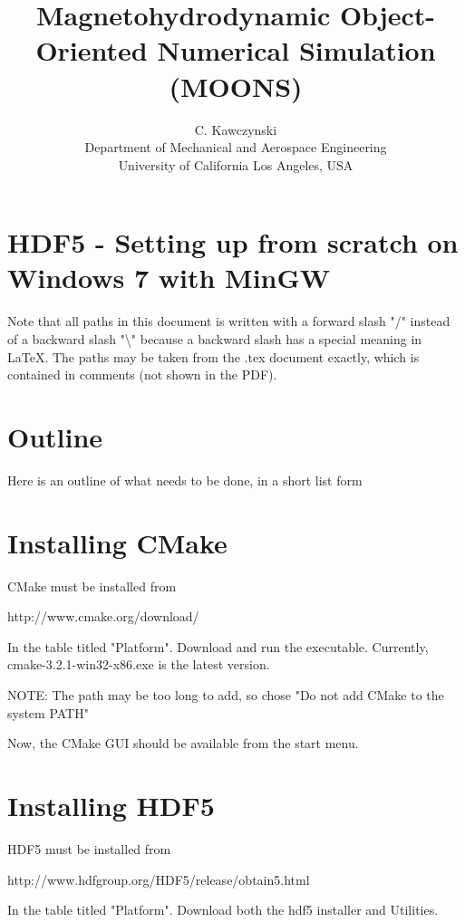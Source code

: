 \documentclass[11pt]{article}
\begin{document}
\doublespacing
\title{Magnetohydrodynamic Object-Oriented Numerical Simulation (MOONS)}
\author{C. Kawczynski \\
Department of Mechanical and Aerospace Engineering \\
University of California Los Angeles, USA\\
}
\maketitle

\section{HDF5 - Setting up from scratch on Windows 7 with MinGW}
Note that all paths in this document is written with a forward slash "/" instead of a backward slash "\textbackslash" because a backward slash has a special meaning in LaTeX. The paths may be taken from the .tex document exactly, which is contained in comments (not shown in the PDF).

\section{Outline}
Here is an outline of what needs to be done, in a short list form

\section{Installing CMake}
CMake must be installed from

http://www.cmake.org/download/

In the table titled "Platform". Download and run the executable. Currently, cmake-3.2.1-win32-x86.exe is the latest version.

NOTE: The path may be too long to add, so chose "Do not add CMake to the system PATH"

Now, the CMake GUI should be available from the start menu.

\section{Installing HDF5}

HDF5 must be installed from

http://www.hdfgroup.org/HDF5/release/obtain5.html

In the table titled "Platform". Download both the hdf5 installer and Utilities.
\end{document}
